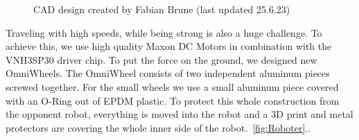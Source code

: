 \documentclass{scrartcl}
\begin{document}
\begin{figure}[!h]
    \begin{center}
    \caption{CAD design created by Fabian Brune (last updated 25.6.23)}
    \label{Robot}
    \end{center}
    \end{figure}

Traveling with high speeds, while being strong is also a huge challenge. To achieve this, we use high quality
Maxon DC Motors in combination with the VNH3SP30 driver chip. To put the force on the ground, we designed
new OmniWheels.
The OmniWheel consists of two independent aluminum pieces screwed together. For the small wheels we use a small
aluminum piece covered with an O-Ring out of EPDM plastic.
\newline
To protect this whole construction from the opponent robot, everything is moved into the robot and a 3D
print and metal protectors are covering the whole inner side of the robot.~\ref{fig:Roboter}..
\newpage
\end{document}
